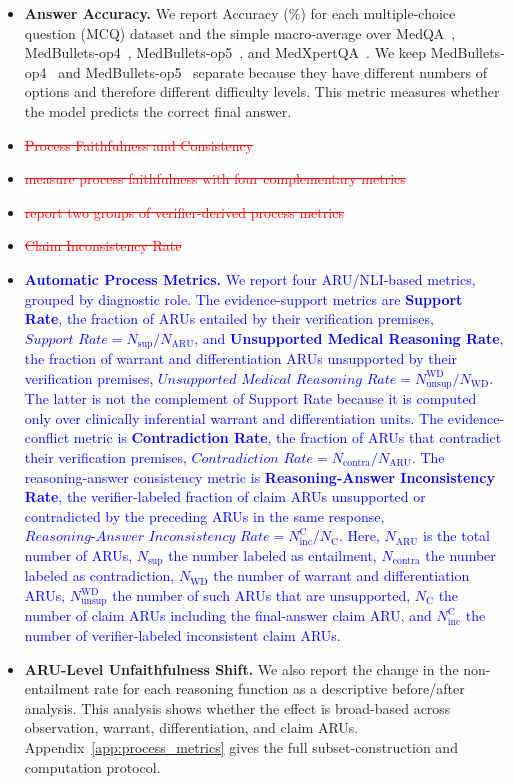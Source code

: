 \documentclass[a4paper,fleqn,doubleblind]{cas-sc}
\DeclareRobustCommand{\deleted}[1]{\textcolor{red}{\sout{#1}}}
\DeclareRobustCommand{\added}[1]{\textcolor{blue}{#1}}
\begin{document}
\begin{itemize}[leftmargin=*]
    \item \textbf{Answer Accuracy.} We report Accuracy (\%) for each multiple-choice question (MCQ) dataset and the simple macro-average over MedQA~\cite{jin2021disease}, MedBullets-op4~\cite{chen2025benchmarking}, MedBullets-op5~\cite{chen2025benchmarking}, and MedXpertQA~\cite{zuo2025medxpertqa}. We keep MedBullets-op4~\cite{chen2025benchmarking} and MedBullets-op5~\cite{chen2025benchmarking} separate because they have different numbers of options and therefore different difficulty levels. This metric measures whether the model predicts the correct final answer.
\item \deleted{Process Faithfulness and Consistency}
\item \deleted{measure process faithfulness with four complementary metrics}
\item \deleted{report two groups of verifier-derived process metrics}
\item \deleted{Claim Inconsistency Rate}
    \item \added{\textbf{Automatic Process Metrics.} We report four ARU/NLI-based metrics, grouped by diagnostic role. The evidence-support metrics are \textbf{Support Rate}, the fraction of ARUs entailed by their verification premises, $\textit{Support Rate} = N_{\text{sup}} / N_{\text{ARU}}$, and \textbf{Unsupported Medical Reasoning Rate}, the fraction of warrant and differentiation ARUs unsupported by their verification premises, $\textit{Unsupported Medical Reasoning Rate} = N_{\text{unsup}}^{\text{WD}} / N_{\text{WD}}$. The latter is not the complement of Support Rate because it is computed only over clinically inferential warrant and differentiation units. The evidence-conflict metric is \textbf{Contradiction Rate}, the fraction of ARUs that contradict their verification premises, $\textit{Contradiction Rate} = N_{\text{contra}} / N_{\text{ARU}}$. The reasoning-answer consistency metric is \textbf{Reasoning-Answer Inconsistency Rate}, the verifier-labeled fraction of claim ARUs unsupported or contradicted by the preceding ARUs in the same response, $\textit{Reasoning-Answer Inconsistency Rate} = N_{\text{inc}}^{\text{C}} / N_{\text{C}}$. Here, $N_{\text{ARU}}$ is the total number of ARUs, $N_{\text{sup}}$ the number labeled as entailment, $N_{\text{contra}}$ the number labeled as contradiction, $N_{\text{WD}}$ the number of warrant and differentiation ARUs, $N_{\text{unsup}}^{\text{WD}}$ the number of such ARUs that are unsupported, $N_{\text{C}}$ the number of claim ARUs including the final-answer claim ARU, and $N_{\text{inc}}^{\text{C}}$ the number of verifier-labeled inconsistent claim ARUs.}
    \item \textbf{ARU-Level Unfaithfulness Shift.} We also report the change in the non-entailment rate for each reasoning function as a descriptive before/after analysis. This analysis shows whether the effect is broad-based across observation, warrant, differentiation, and claim ARUs. Appendix~\ref{app:process_metrics} gives the full subset-construction and computation protocol.
\end{itemize}
\end{document}
